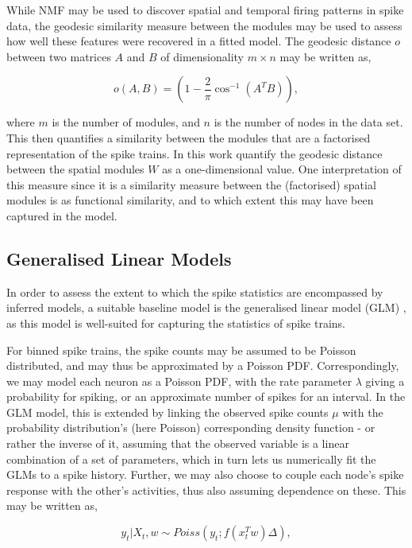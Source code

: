 \documentclass[mphil,deptreport,ianc]{infthesis} %
\begin{document}
While NMF may be used to discover spatial and temporal firing patterns in spike data, the geodesic similarity measure between the modules may be used to assess how well these features were recovered in a fitted model.
The geodesic distance $o$ between two matrices $A$ and $B$ of dimensionality $m \times n$ may be written as,

\begin{equation}
    o(A, B) = (1-\frac{2}{\pi}\cos^{-1}(A^TB)),
\end{equation}

where $m$ is the number of modules, and $n$ is the number of nodes in the data set.
This then quantifies a similarity between the modules that are a factorised representation of the spike trains. 
In this work quantify the geodesic distance between the spatial modules $W$ as a one-dimensional value. One interpretation of this measure since it is a similarity measure between the (factorised) spatial modules is as functional similarity, and to which extent this may have been captured in the model.


\subsection{Generalised Linear Models}\label{subsect:GLMs}

In order to assess the extent to which the spike statistics are encompassed by inferred models, a suitable baseline model is the generalised linear model (GLM) \cite{Nelder1972, Fernandez2000}, as this model is well-suited for capturing the statistics of spike trains.

For binned spike trains, the spike counts may be assumed to be Poisson distributed, and may thus be approximated by a Poisson PDF.
Correspondingly, we may model each neuron as a Poisson PDF, with the rate parameter $\lambda$ giving a probability for spiking, or an approximate number of spikes for an interval.
In the GLM model, this is extended by linking the observed spike counts $\mu$ with the probability distribution's (here Poisson) corresponding density function - or rather the inverse of it, assuming that the observed variable is a linear combination of a set of parameters, which in turn lets us numerically fit the GLMs to a spike history.
Further, we may also choose to couple each node's spike response with the other's activities, thus also assuming dependence on these. This may be written as,

\begin{equation}
    y_t|X_t, w \sim Poiss(y_t; f(x_t^T w)\Delta),
\end{equation}
\end{document}
